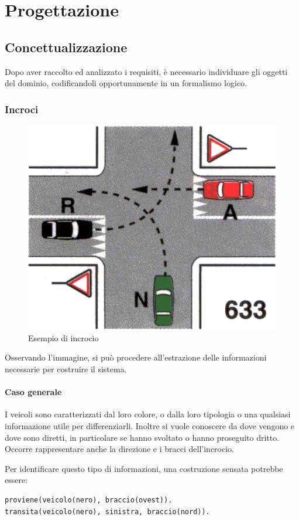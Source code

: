 \chapter{Progettazione}

\section{Concettualizzazione}
Dopo aver raccolto ed analizzato i requisiti, è necessario individuare gli oggetti del dominio, codificandoli opportunamente in un formalismo logico.

\subsection{Incroci}

\begin{figure}[htb]
	\centering
	\includegraphics[width=.5\textwidth]{images/example}
	\caption{Esempio di incrocio}
	\label{fig:inc}
\end{figure}


Osservando l'immagine, si può procedere all'estrazione delle informazioni necessarie per costruire il sistema.

\subsubsection{Caso generale}

I veicoli sono caratterizzati dal loro colore, o dalla loro tipologia o una qualsiasi informazione utile per differenziarli. Inoltre si vuole conoscere da dove vengono e dove sono diretti, in particolare se hanno svoltato o hanno proseguito dritto. Occorre rappresentare anche la direzione e i bracci dell'incrocio.

Per identificare questo tipo di informazioni, una costruzione sensata potrebbe essere:
\begin{verbatim}
proviene(veicolo(nero), braccio(ovest)).
transita(veicolo(nero), sinistra, braccio(nord)).
\end{verbatim}

